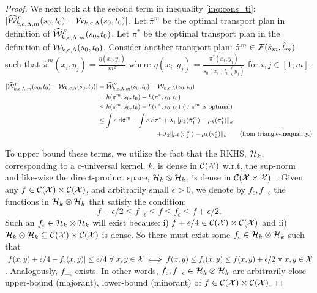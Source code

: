 \begin{proof}
We next look at the second term in inequality \ref{inq:cons_ti}: $|\widehat{\mathcal{W}}^F_{k, c, \Lambda, m}(s_0, t_0)-\mathcal{W}_{k, c, \Lambda}(s_0, t_0)|$. Let $\bar{\pi}^m$ be the optimal transport plan in definition of $\widehat{\mathcal{W}}^F_{k, c, \Lambda, m}(s_0, t_0)$. Let $\pi^*$ be the optimal transport plan in the definition of $\mathcal{W}_{k, c, \Lambda}(s_0, t_0)$. Consider another transport plan: $\hat{\pi}^m\in \mathcal{F}(\hat{s}_m,\hat{t}_m)$ such that $\hat{\pi}^m(x_i, y_j)=\frac{\eta(x_i, y_j)}{m^2}$ where $\eta(x_i, y_j)=\frac{\pi^*(x_i, y_j)}{s_0(x_i)t_0(y_j)}$ for $i, j\in [1,m]$. 
\begin{align*}
|\widehat{\mathcal{W}}^F_{k, c, \Lambda, m}(s_0, t_0)-\mathcal{W}_{k, c, \Lambda}(s_0, t_0)| &= \widehat{\mathcal{W}}^F_{k, c, \Lambda, m}(s_0, t_0)-\mathcal{W}_{k, c, \Lambda}(s_0, t_0)\\&= h(\bar{\pi}^m, s_0, t_0)-h(\pi^*, s_0, t_0)\\&\leq h(\hat{\pi}^m, s_0, t_0)-h(\pi^*, s_0, t_0)\ (\because \bar{\pi}^m \textup{ is optimal})\\
&\leq \int c~\textup{d}\hat{\pi}^m-\int c~\textup{d}\pi^*+\lambda_1 \|\mu_k(\hat{\pi}^m_1)-\mu_k(\pi^*_1)\|_k \\&\qquad\qquad\qquad\qquad\quad+ \lambda_2 \|\mu_k(\hat{\pi}^m_2)-\mu_k(\pi^*_2)\|_k \tag{from triangle-inequality.}
\end{align*}

To upper bound these terms, we utilize the fact that the RKHS, $\mathcal{H}_k$, corresponding to a c-universal kernel, $k$, is dense in $\mathcal{C}(\mathcal{X})$ w.r.t. the sup-norm~\citep{SriperumbudurFL11} and like-wise the direct-product space, $\mathcal{H}_k\otimes\mathcal{H}_k$, is dense in $\mathcal{C}(\mathcal{X}\times\mathcal{X})$~\citep{gretton2015simpler}. Given any $f\in\mathcal{C}(\mathcal{X})\times\mathcal{C}(\mathcal{X})$, and arbitrarily small $\epsilon>0$, we denote by $f_\epsilon,f_{-\epsilon}$ the functions in $\mathcal{H}_k\otimes\mathcal{H}_k$ that satisfy the condition: $$f-\epsilon/2\le f_{-\epsilon}\le f\le f_\epsilon\le f+\epsilon/2.$$Such an $f_\epsilon\in\mathcal{H}_k\otimes\mathcal{H}_k$ will exist because: i) $f+\epsilon/4\in\mathcal{C}(\mathcal{X})\times\mathcal{C}(\mathcal{X})$ and ii) $\mathcal{H}_k\otimes\mathcal{H}_k\subseteq\mathcal{C}(\mathcal{X})\times\mathcal{C}(\mathcal{X})$ is dense. So there must exist some $f_\epsilon\in\mathcal{H}_k\otimes\mathcal{H}_k$ such that $|f(x,y)+\epsilon/4-f_\epsilon(x,y)|\le\epsilon/4\ \forall\ x,y\in\mathcal{X}\iff f(x,y)\le f_\epsilon(x,y)\le f(x,y)+\epsilon/2\ \forall\ x,y\in\mathcal{X}$. Analogously, $f_{-\epsilon}$ exists. In other words, $f_\epsilon,f_{-\epsilon}\in\mathcal{H}_k\otimes\mathcal{H}_k$ are arbitrarily close upper-bound (majorant), lower-bound (minorant) of $f\in\mathcal{C}(\mathcal{X})\times\mathcal{C}(\mathcal{X})$.


\end{proof}
